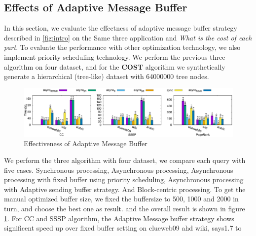 \subsection{Effects of Adaptive Message Buffer}
\label{sec:expr:AMBuffer}
In this section, we evaluate the effectness of adaptive message buffer strategy described in \ref{fig:intro} on the Same three application and \emph{What is the cost of each part}\cite{7113340}. To evaluate the performance with other optimization technology, we also implement priority scheduling technology. We perform the previous three algorithm on four dataset, and for the \textbf{COST} algorithm we synthetically generate a hierarchical (tree-like) dataset with 64000000 tree nodes.

\begin{figure}[!t]
	\vspace{0.0in}
	\centering
	\includegraphics[width=6.6in]{figuration/summary.eps}
	\vspace{-0.1in}
	\caption{Effectiveness of Adaptive Message Buffer}
	\label{fig:summary}
	\vspace{-0.1in}
\end{figure}
We perform the three algorithm with four dataset, we compare each query with five cases. Synchronous processing, Asynchronous processing, Asynchronous processing with fixed buffer using priority scheduling, Asynchronous processing with Adaptive sending buffer strategy. And Block-centric processing. To get the manual optimized buffer size, we fixed the buffersize to 500, 1000 and 2000 in turn, and choose the best one as result.  and the overall result is shown in figure \ref{fig:summary}.
For CC and SSSP algorithm, the Adaptive Message buffer strategy shows significent speed up over fixed buffer setting on clueweb09 ahd wiki, says1.7 to   

